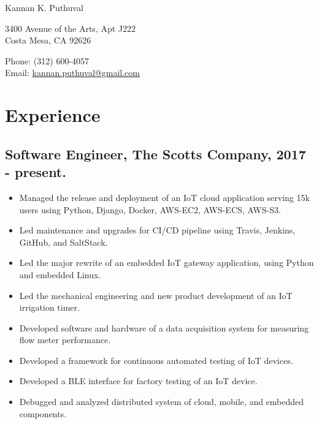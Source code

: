 \documentclass[letterpaper]{article}
\def\name{Kannan K. Puthuval}
\begin{document}
{\huge \name}


\vspace{0.25in}

\begin{minipage}{0.45\linewidth}
  3400 Avenue of the Arts, Apt J222 \\
  Costa Mesa, CA 92626 \\
\end{minipage}
\begin{minipage}{0.45\linewidth}
  Phone: (312) 600-4057 \\
  Email: \href{mailto:kannan.puthuval@gmail.com}{kannan.puthuval@gmail.com} \\
\end{minipage}

\section*{Experience}

  \subsection*{Software Engineer, The Scotts Company, 2017 - present.}

    \begin{itemize}

      \item Managed the release and deployment of an IoT cloud application serving 15k users using Python, Django, Docker, AWS-EC2, AWS-ECS, AWS-S3.
      \item Led maintenance and upgrades for CI/CD pipeline using Travis, Jenkins, GitHub, and SaltStack.
      \item Led the major rewrite of an embedded IoT gateway application, using Python and embedded Linux.
      \item Led the mechanical engineering and new product development of an IoT irrigation timer.
      \item Developed software and hardware of a data acquisition system for measuring flow meter performance.
      \item Developed a framework for continuous automated testing of IoT devices.
      \item Developed a BLE interface for factory testing of an IoT device.
      \item Debugged and analyzed distributed system of cloud, mobile, and embedded components.

    \end{itemize}
\end{document}
